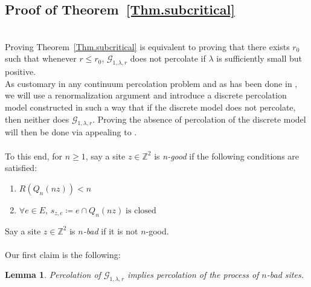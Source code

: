 \documentclass[10pt,a4paper]{amsart}
\theoremstyle{exampstyle}
\newtheorem{Lemma}{Lemma}
\theoremstyle{exampnotations}
\begin{document}
\subsection{Proof of Theorem~\ref{Thm.subcritical}}\mbox{}\\
Proving Theorem~\ref{Thm.subcritical} is equivalent to proving that there exists $r_0$ such that whenever $r \leq r_0$, $\mathcal{G}_{1, \lambda, r}$ does not percolate if $\lambda$ is sufficiently small but positive. \\
As customary in any continuum percolation problem and as has been done in \cite{hirsch2018continuum}, we will use a renormalization argument and introduce a discrete percolation model constructed in such a way that if the discrete model does not percolate, then neither does $\mathcal{G}_{1, \lambda,r}$. Proving the absence of percolation of the discrete model will then be done via appealing to \cite[Theorem 0.0]{liggett_domination_1997}. \\
\\
To this end, for $n \geq 1$, say a site $z \in \mathbb{Z}^{2}$ is \emph{n-good} if the following conditions are satisfied: 
\begin{enumerate}
\item $R(Q_n(nz)) < n$
\item $\forall e \in E, \, s_{z,e} \coloneqq e \cap Q_n(nz) \; \text{is closed}$
\end{enumerate}
Say a site $z \in \mathbb{Z}^{2}$ is \emph{$n$-bad} if it is not $n$-good. \\
\\
Our first claim is the following:
\begin{Lemma}
\label{Claim1.subcritical}
Percolation of $\mathcal{G}_{1, \lambda,r}$ implies percolation of the process of $n$-bad sites.
\end{Lemma}
\end{document}
